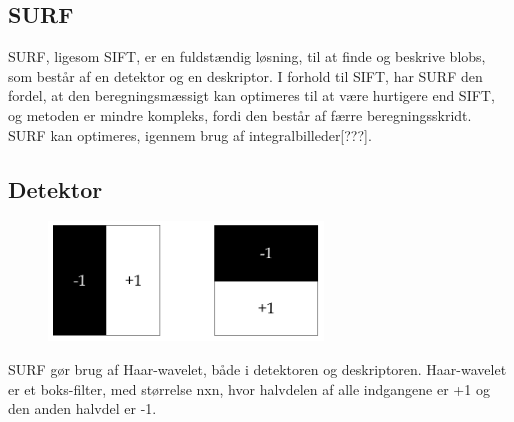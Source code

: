
\subsection{SURF}
SURF, ligesom SIFT, er en fuldstændig løsning, til at finde og beskrive blobs, som består af en detektor og en deskriptor. I forhold til SIFT, har SURF den fordel, at den beregningsmæssigt kan optimeres til at være hurtigere end SIFT, og metoden er mindre kompleks, fordi den består af færre beregningsskridt. SURF kan optimeres, igennem brug af integralbilleder[???].
\subsection*{Detektor}

\begin{figure}[H]
    \centering
    \includegraphics[width=0.65\textwidth]{fig/haarwavelet.png}
     \vspace{-1em}
    \begin{center}    
       \caption{\textcolor{gray}{\footnotesize \textit{ }}}
    \label{fig:haarwavelet}
     \end{center}
     \vspace{-2.5em}
  \end{figure} \noindent

SURF gør brug af Haar-wavelet, både i detektoren og deskriptoren. Haar-wavelet er et boks-filter, med størrelse nxn, hvor halvdelen af alle indgangene er +1 og den anden halvdel er -1.


